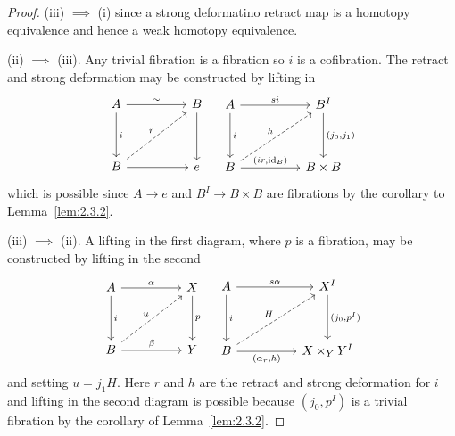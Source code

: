 \documentclass[../main]{subfiles}
\begin{document}
\begin{proof}
(iii) $\implies$ (i) since a strong deformatino retract map is a homotopy equivalence and hence a weak homotopy equivalence. 

(ii) $\implies$ (iii). Any trivial fibration is a fibration so $i$ is a cofibration. The retract and strong deformation may be constructed by lifting in 
\begin{equation*}
\begin{tikzcd}
A \arrow[rr, "\sim"] \arrow[dd, "i"]   &  & B \arrow[dd] \\
                                       &  &              \\
B \arrow[rruu, "r", dashed] \arrow[rr] &  & e           
\end{tikzcd}
\quad
\begin{tikzcd}
A \arrow[rr, "si"] \arrow[dd, "i"]                      &  & B^I \arrow[dd, "{(j_0, j_1)}"] \\
                                                        &  &                                \\
B \arrow[rr, "{(ir, \id_B)}"] \arrow[rruu, "h", dashed] &  & B\times B                     
\end{tikzcd}
\end{equation*} 
which is possible since $A \to e$ and $B^I \to B \times B$ are fibrations by the corollary to Lemma~\ref{lem:2.3.2}.

(iii) $\implies$ (ii). A lifting in the first diagram, where $p$ is a fibration, may be constructed by lifting in the second 
\begin{equation*}
\begin{tikzcd}
A \arrow[rr, "\alpha"] \arrow[dd, "i"]          &  & X \arrow[dd, "p"] \\
                                                &  &                   \\
B \arrow[rr, "\beta"] \arrow[rruu, "u", dashed] &  & Y                
\end{tikzcd}
\quad
\begin{tikzcd}
A \arrow[rr, "s\alpha"] \arrow[dd, "i"]                    &  & X^I \arrow[dd, "{(j_0, p^I)}"] \\
                                                           &  &                                \\
B \arrow[rruu, "H", dashed] \arrow[rr, "{(\alpha_r, h)}"'] &  & X \times_Y Y^I                
\end{tikzcd}
\end{equation*} 
and setting $u = j_1 H$. Here $r$ and $h$ are the retract and strong deformation for $i$ and lifting in the second diagram is possible because $(j_0, p^I)$ is a trivial fibration by the corollary of Lemma~\ref{lem:2.3.2}.


\end{proof}
\end{document}
